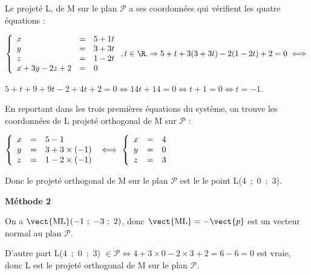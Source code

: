 \begin{enumerate}
Le projeté L,  de M sur le plan $\mathcal P$ a ses coordonnées qui vérifient les quatre équations :

$\left\{\begin{array}{l c l}
x	&=&5 + 1t\\
y 	&=&3 + 3t\\
z	&=&1 - 2t\\
x + 3y - 2z + 2&=&0
\end{array}\right. , t \in \R. \Rightarrow 5 + t  + 3(3 + 3t) - 2(1 - 2t) + 2 = 0 \iff$

$5 + t + 9 + 9t - 2 + 4t + 2 = 0 \iff 14t  + 14 = 0 \iff t + 1 = 0 \iff t = - 1$.

En reportant dans les trois premières équations du système, on trouve les coordonnées de L projeté orthogonal de M sur $\mathcal P$ :

$\left\{\begin{array}{l c l}
x	&=&5 - 1\\
y 	&=&3 + 3\times (- 1)\\
z	&=&1 - 2\times (- 1)\\
\end{array}\right. \iff \left\{\begin{array}{l c l}
x	&=&4\\
y 	&=&0\\
z	&=&3\\
\end{array}\right.$

Donc le projeté orthogonal de M sur le plan $\mathcal P$ est le le point L(4~;~0~;~3).
\end{enumerate}

\textbf{Méthode 2}

On a $\vect{\text{ML}}(-1~;~- 3~;~2)$, donc $\vect{\text{ML}} = - \vect{p}$ est un vecteur normal au plan $\mathcal{P}$.

D'autre part L(4~;~0~;~3) $\in \mathcal{P} \iff 4 + 3 \times 0 - 2 \times 3 + 2 = 6 - 6 = 0$ est vraie, donc L est le projeté orthogonal de M sur le plan $\mathcal P$.
\bigskip
